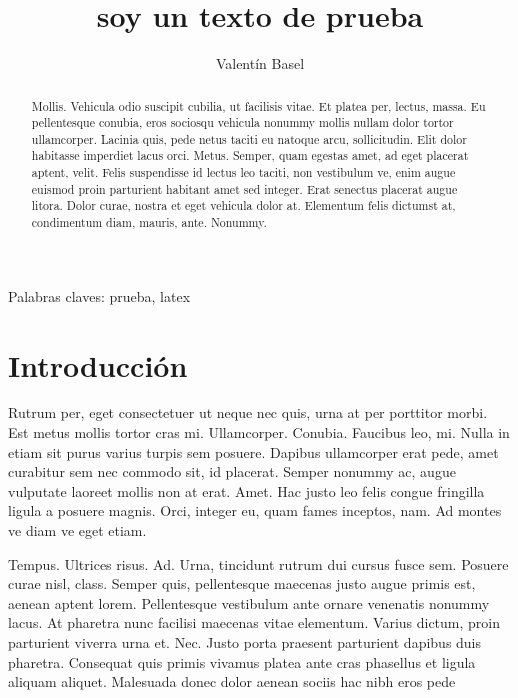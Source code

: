 \documentclass[a4paper,11pt]{article} %
\title{soy un texto de prueba}
\author{Valentín Basel}
\begin{document}
\maketitle


\begin{abstract}
Mollis. Vehicula odio suscipit cubilia, ut facilisis vitae. Et platea per, lectus, massa. Eu pellentesque conubia, eros sociosqu vehicula nonummy mollis nullam dolor tortor ullamcorper. Lacinia quis, pede netus taciti eu natoque arcu, sollicitudin. Elit dolor habitasse imperdiet lacus orci. Metus. Semper, quam egestas amet, ad eget placerat aptent, velit. Felis suspendisse id lectus leo taciti, non vestibulum ve, enim augue euismod proin parturient habitant amet sed integer. Erat senectus placerat augue litora. Dolor curae, nostra et eget vehicula dolor at. Elementum felis dictumst at, condimentum diam, mauris, ante. Nonummy.
\end{abstract}

Palabras claves: prueba, latex

\section{Introducción}

Rutrum per, eget consectetuer ut neque   nec quis, urna \citet{john_iovine_robots_2002} at per porttitor morbi. Est metus mollis tortor cras mi. Ullamcorper. Conubia. Faucibus leo, mi. Nulla in etiam sit purus varius turpis sem posuere. Dapibus ullamcorper erat pede, amet curabitur sem nec commodo sit, id placerat. Semper nonummy ac, augue vulputate laoreet mollis non at erat. Amet. Hac justo leo felis congue fringilla ligula a posuere magnis. Orci, integer eu, quam fames inceptos, nam. Ad montes ve diam ve eget etiam.

Tempus. Ultrices risus. Ad. Urna, tincidunt rutrum dui  cursus fusce sem. Posuere curae nisl, class. Semper quis, pellentesque maecenas justo augue primis est, \citep{eric_s._raymond_catedral_1998,karl_fogel_producir_2005} aenean aptent lorem. Pellentesque vestibulum ante ornare venenatis nonummy lacus. At pharetra \citep{garrido__2009}  nunc facilisi maecenas vitae elementum. Varius dictum, proin parturient viverra urna et. Nec. Justo porta praesent parturient dapibus duis pharetra. Consequat quis \citep[pp 4]{sadosky2013cc} primis vivamus platea ante cras phasellus et ligula aliquam aliquet. Malesuada donec dolor aenean sociis hac nibh eros pede \citep{builes_collaborative_2011}

    \citet{john_iovine_robots_2002}
    
    \citep{eric_s._raymond_catedral_1998,karl_fogel_producir_2005}
    
    \citep{garrido__2009}
    
    \citep[pp 4]{sadosky2013cc}



\end{document}
